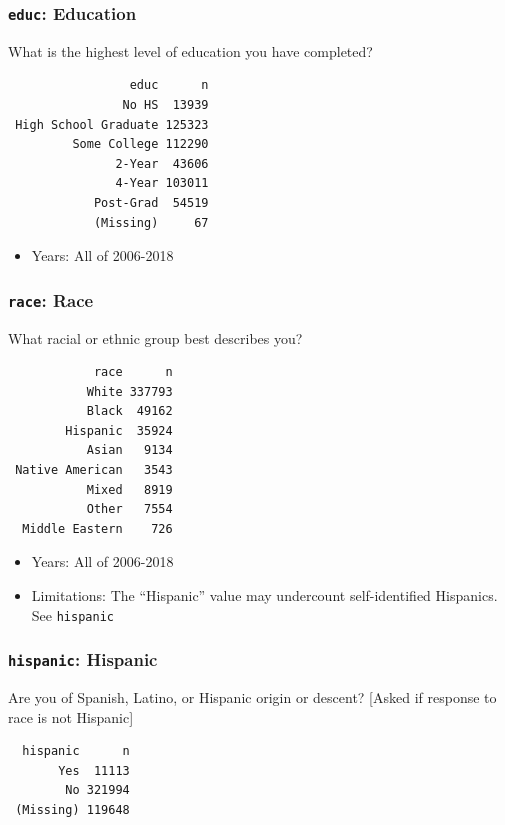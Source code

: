\documentclass[10pt,article,oneside]{memoir}
\theoremstyle{definition}
\begin{document}
\subsubsection{\texorpdfstring{\texttt{educ}:
Education}{educ: Education}}\label{educ-education}

What is the highest level of education you have completed?

\begin{verbatim}
                 educ      n
                No HS  13939
 High School Graduate 125323
         Some College 112290
               2-Year  43606
               4-Year 103011
            Post-Grad  54519
            (Missing)     67
\end{verbatim}

\begin{itemize}
\tightlist
\item
  Years: All of 2006-2018
\end{itemize}

\subsubsection{\texorpdfstring{\texttt{race}:
Race}{race: Race}}\label{race-race}

What racial or ethnic group best describes you?

\begin{verbatim}
            race      n
           White 337793
           Black  49162
        Hispanic  35924
           Asian   9134
 Native American   3543
           Mixed   8919
           Other   7554
  Middle Eastern    726
\end{verbatim}

\begin{itemize}
\tightlist
\item
  Years: All of 2006-2018
\item
  Limitations: The ``Hispanic'' value may undercount self-identified
  Hispanics. See \texttt{hispanic}
\end{itemize}

\subsubsection{\texorpdfstring{\texttt{hispanic}:
Hispanic}{hispanic: Hispanic}}\label{hispanic-hispanic}

Are you of Spanish, Latino, or Hispanic origin or descent? {[}Asked if
response to race is not Hispanic{]}

\begin{verbatim}
  hispanic      n
       Yes  11113
        No 321994
 (Missing) 119648
\end{verbatim}
\end{document}
